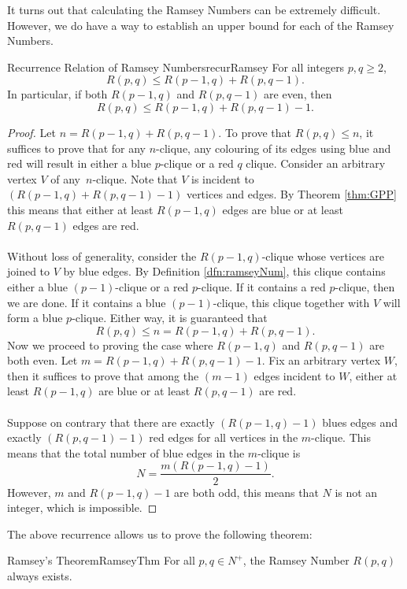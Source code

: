 \documentclass[math]{amznotes}
\theoremstyle{remark}
\newcommand{\0}{\mathbf{0}}
\newcommand{\1}{\mathbf{1}}
\begin{document}
It turns out that calculating the Ramsey Numbers can be extremely difficult. However, we do have a way to establish an upper bound for each of the Ramsey Numbers.
\begin{thmbox}{Recurrence Relation of Ramsey Numbers}{recurRamsey}
    For all integers $p, q \geq 2$,
    \begin{equation*}
        R(p, q) \leq R(p - 1, q) + R(p, q - 1).
    \end{equation*}
    In particular, if both $R(p - 1, q)$ and $R(p, q - 1)$ are even, then
    \begin{equation*}
        R(p, q) \leq R(p - 1, q) + R(p, q - 1) - 1.
    \end{equation*}
    \tcblower
    \begin{proof}
        Let $n = R(p - 1, q) + R(p, q - 1)$. To prove that $R(p, q) \leq n$, it suffices to prove that for any $n$-clique, any colouring of its edges using blue and red will result in either a blue $p$-clique or a red $q$ clique. Consider an arbitrary vertex $V$ of any~$n$-clique. Note that $V$ is incident to $\left(R(p - 1, q) + R(p, q - 1) - 1\right)$ vertices and edges. By Theorem \ref{thm:GPP} this means that either at least $R(p - 1, q)$ edges are blue or at least $R(p, q - 1)$ edges are red.
        \\\\ 
        Without loss of generality, consider the $R(p - 1, q)$-clique whose vertices are joined to $V$ by blue edges. By Definition \ref{dfn:ramseyNum}, this clique contains either a blue $(p - 1)$-clique or a red $p$-clique. If it contains a red $p$-clique, then we are done. If it contains a blue $(p - 1)$-clique, this clique together with $V$ will form a blue $p$-clique. Either way, it is guaranteed that
        \begin{equation*}
            R(p, q) \leq n = R(p - 1, q) + R(p, q - 1).
        \end{equation*}
        Now we proceed to proving the case where $R(p - 1, q)$ and $R(p, q - 1)$ are both even. Let $m = R(p - 1, q) + R(p, q - 1) - 1$. Fix an arbitrary vertex $W$, then it suffices to prove that among the $(m - 1)$ edges incident to $W$, either at least $R(p - 1, q)$ are blue or at least $R(p, q - 1)$ are red.
        \\\\
        Suppose on contrary that there are exactly $\left(R(p - 1, q) - 1\right)$ blues edges and exactly $\left(R(p, q - 1) - 1\right)$ red edges for all vertices in the $m$-clique. This means that the total number of blue edges in the $m$-clique is
        \begin{equation*}
            N = \frac{m\left(R(p - 1, q) - 1\right)}{2}.
        \end{equation*}
        However, $m$ and $R(p - 1, q) - 1$ are both odd, this means that $N$ is not an integer, which is impossible.
    \end{proof}
\end{thmbox}
The above recurrence allows us to prove the following theorem:
\begin{thmbox}{Ramsey's Theorem}{RamseyThm}
    For all $p, q \in N^+$, the Ramsey Number $R(p, q)$ always exists.
\end{thmbox}
\end{document}
